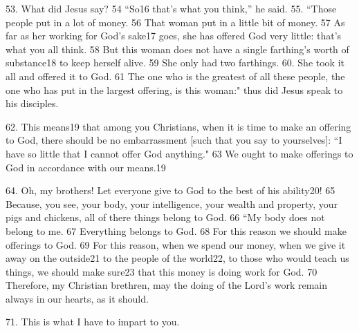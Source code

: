 53. What did Jesus say? 54 ``So16 that's what you think,'' he said.
55. ``Those people put in a lot of money. 56 That woman put in a little
bit of money. 57 As far as her working for God's sake17 goes, she has offered God
very little: that's what you all think. 58 But this woman does not have a single
farthing's worth of substance18 to keep herself alive. 59 She only had two farthings.
60. She took it all and offered it to God. 61 The one who is the greatest of all
these people, the one who has put in the largest offering, is this woman:"
thus did Jesus speak to his disciples.

62. This means19 that among you Christians, when it is time to make an offering
to God, there should be no embarrassment [such that you say to yourselves]: ``I
have so little that I cannot offer God anything." 63 We ought to make
offerings to God in accordance with our means.19

64. Oh, my brothers! Let everyone give to God to the best of his ability20! 65 Because,
you see, your body, your intelligence, your wealth and property, your pigs and
chickens, all of there things belong to God. 66 ``My body does not belong
to me. 67 Everything belongs to God. 68 For this reason we should make offerings
to God. 69 For this reason, when we spend our money, when we give it away on the
outside21 to the people of the world22, to those who would teach us things, we
should make sure23 that this money is doing work for God. 70 Therefore, my Christian
brethren, may the doing of the Lord's work remain always in our hearts, as it should.

71. This is what I have to impart to you.

